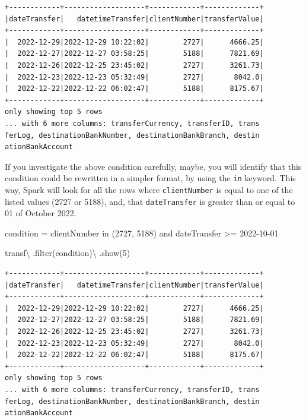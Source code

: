 \documentclass[
  11pt,
  letterpaper,
  DIV=11,
  numbers=noendperiod]{scrreprt}
\newenvironment{Shaded}{\begin{snugshade}}{\end{snugshade}}
\newcommand{\BuiltInTok}[1]{\textcolor[rgb]{0.00,0.23,0.31}{#1}}
\newcommand{\DecValTok}[1]{\textcolor[rgb]{0.68,0.00,0.00}{#1}}
\newcommand{\NormalTok}[1]{\textcolor[rgb]{0.00,0.23,0.31}{#1}}
\newcommand{\OperatorTok}[1]{\textcolor[rgb]{0.37,0.37,0.37}{#1}}
\newcommand{\StringTok}[1]{\textcolor[rgb]{0.13,0.47,0.30}{#1}}
\begin{document}
\begin{verbatim}
+------------+-------------------+------------+-------------+
|dateTransfer|   datetimeTransfer|clientNumber|transferValue|
+------------+-------------------+------------+-------------+
|  2022-12-29|2022-12-29 10:22:02|        2727|      4666.25|
|  2022-12-27|2022-12-27 03:58:25|        5188|      7821.69|
|  2022-12-26|2022-12-25 23:45:02|        2727|      3261.73|
|  2022-12-23|2022-12-23 05:32:49|        2727|       8042.0|
|  2022-12-22|2022-12-22 06:02:47|        5188|      8175.67|
+------------+-------------------+------------+-------------+
only showing top 5 rows
... with 6 more columns: transferCurrency, transferID, trans
ferLog, destinationBankNumber, destinationBankBranch, destin
ationBankAccount
\end{verbatim}

If you investigate the above condition carefully, maybe, you will
identify that this condition could be rewritten in a simpler format, by
using the \texttt{in} keyword. This way, Spark will look for all the
rows where \texttt{clientNumber} is equal to one of the listed values
(2727 or 5188), and, that \texttt{dateTransfer} is greater than or equal
to 01 of October 2022.

\begin{Shaded}
\begin{Highlighting}[]
\NormalTok{condition }\OperatorTok{=} \StringTok{\textquotesingle{}\textquotesingle{}\textquotesingle{}}
\StringTok{  clientNumber in (2727, 5188)}
\StringTok{  and dateTransfer \textgreater{}= \textquotesingle{}2022{-}10{-}01\textquotesingle{}}
\StringTok{\textquotesingle{}\textquotesingle{}\textquotesingle{}}

\NormalTok{transf}\OperatorTok{\textbackslash{}}
\NormalTok{  .}\BuiltInTok{filter}\NormalTok{(condition)}\OperatorTok{\textbackslash{}}
\NormalTok{  .show(}\DecValTok{5}\NormalTok{)}
\end{Highlighting}
\end{Shaded}

\begin{verbatim}
+------------+-------------------+------------+-------------+
|dateTransfer|   datetimeTransfer|clientNumber|transferValue|
+------------+-------------------+------------+-------------+
|  2022-12-29|2022-12-29 10:22:02|        2727|      4666.25|
|  2022-12-27|2022-12-27 03:58:25|        5188|      7821.69|
|  2022-12-26|2022-12-25 23:45:02|        2727|      3261.73|
|  2022-12-23|2022-12-23 05:32:49|        2727|       8042.0|
|  2022-12-22|2022-12-22 06:02:47|        5188|      8175.67|
+------------+-------------------+------------+-------------+
only showing top 5 rows
... with 6 more columns: transferCurrency, transferID, trans
ferLog, destinationBankNumber, destinationBankBranch, destin
ationBankAccount
\end{verbatim}
\end{document}
